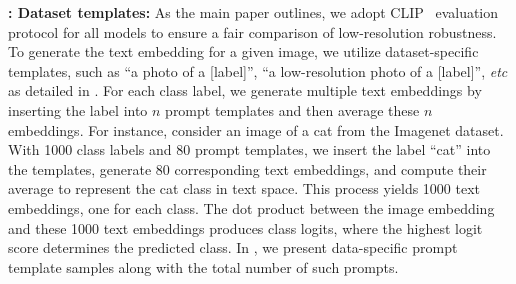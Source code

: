 \textbf{: Dataset templates:} As the main paper outlines, we adopt CLIP~\cite{radford2021learning} evaluation protocol for all models to ensure a fair comparison of low-resolution robustness. To generate the text embedding for a given image, we utilize dataset-specific templates, such as ``a photo of a [label]'', ``a low-resolution photo of a [label]'', \emph{etc} as detailed in . For each class label, we generate multiple text embeddings by inserting the label into $n$ prompt templates and then average these $n$ embeddings. For instance, consider an image of a cat from the Imagenet dataset. With 1000 class labels and 80 prompt templates, we insert the label ``cat'' into the templates, generate 80 corresponding text embeddings, and compute their average to represent the cat class in text space. This process yields 1000 text embeddings, one for each class. The dot product between the image embedding and these 1000 text embeddings produces class logits, where the highest logit score determines the predicted class. In , we present data-specific prompt template samples along with the total number of such prompts.


